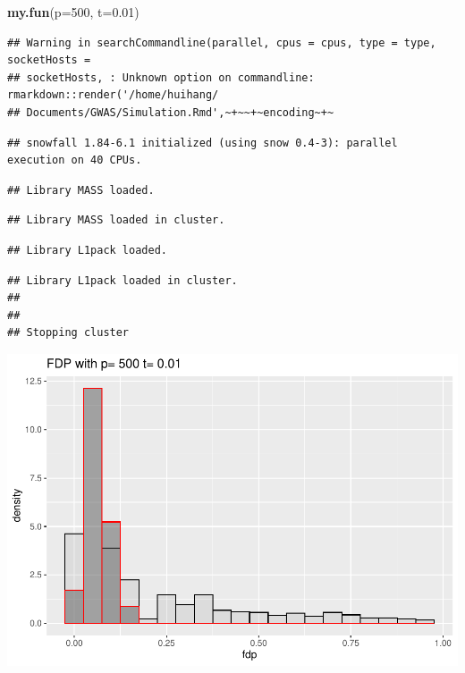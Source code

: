 \documentclass[]{article}
\newenvironment{Shaded}{\begin{snugshade}}{\end{snugshade}}
\newcommand{\DataTypeTok}[1]{\textcolor[rgb]{0.13,0.29,0.53}{#1}}
\newcommand{\DecValTok}[1]{\textcolor[rgb]{0.00,0.00,0.81}{#1}}
\newcommand{\FloatTok}[1]{\textcolor[rgb]{0.00,0.00,0.81}{#1}}
\newcommand{\KeywordTok}[1]{\textcolor[rgb]{0.13,0.29,0.53}{\textbf{#1}}}
\newcommand{\NormalTok}[1]{#1}
\begin{document}
\begin{Shaded}
\begin{Highlighting}[]
\KeywordTok{my.fun}\NormalTok{(}\DataTypeTok{p=}\DecValTok{500}\NormalTok{, }\DataTypeTok{t=}\FloatTok{0.01}\NormalTok{)}
\end{Highlighting}
\end{Shaded}

\begin{verbatim}
## Warning in searchCommandline(parallel, cpus = cpus, type = type, socketHosts =
## socketHosts, : Unknown option on commandline: rmarkdown::render('/home/huihang/
## Documents/GWAS/Simulation.Rmd',~+~~+~encoding~+~
\end{verbatim}

\begin{verbatim}
## snowfall 1.84-6.1 initialized (using snow 0.4-3): parallel execution on 40 CPUs.
\end{verbatim}

\begin{verbatim}
## Library MASS loaded.
\end{verbatim}

\begin{verbatim}
## Library MASS loaded in cluster.
\end{verbatim}

\begin{verbatim}
## Library L1pack loaded.
\end{verbatim}

\begin{verbatim}
## Library L1pack loaded in cluster.
## 
## 
## Stopping cluster
\end{verbatim}

\includegraphics{Simulation_files/figure-latex/unnamed-chunk-1-2.pdf}
\end{document}
